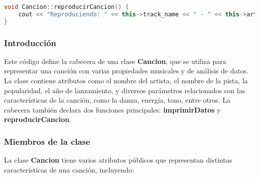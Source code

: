 \documentclass[corference]{IEEEtran}
\begin{document}
\begin{flushleft}
\begin{lstlisting}[language=C++, style=mystyle, caption={Código de un Clase Canción}]
void Cancion::reproducirCancion() {
    cout << "Reproduciendo: " << this->track_name << " - " << this->artist_name << endl;
}
            \end{lstlisting}

            \subsubsection{Introducción}
            
                \noindent\hspace*{4em}Este código define la cabecera de una clase \textbf{Cancion}, que se utiliza para representar una canción con varias propiedades musicales y de análisis de datos. La clase contiene atributos como el nombre del artista, el nombre de la pista, la popularidad, el año de lanzamiento, y diversos parámetros relacionados con las características de la canción, como la danza, energía, tono, entre otros. La cabecera también declara dos funciones principales: \textbf{imprimirDatos} y \textbf{reproducirCancion}.
            
            \subsubsection{Miembros de la clase}
            
                \noindent\hspace*{4em}La clase \textbf{Cancion} tiene varios atributos públicos que representan distintas características de una canción, incluyendo:
                

\end{flushleft}
\end{document}
